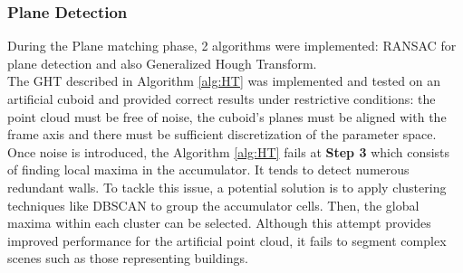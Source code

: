 \subsubsection{Plane Detection}
During the Plane matching phase, 2 algorithms were implemented: RANSAC for plane detection and also Generalized Hough Transform.\\

The GHT described in Algorithm \ref{alg:HT} was implemented and tested on an artificial cuboid and provided correct results under restrictive conditions: the point cloud must be free of noise, the cuboid's planes must be aligned with the frame axis and there must be sufficient discretization of the parameter space.\\

Once noise is introduced, the Algorithm \ref{alg:HT} fails at \textbf{Step 3} which consists of finding local maxima in the accumulator. It tends to detect numerous redundant walls. To tackle this issue, a potential solution is to apply clustering techniques like DBSCAN to group the accumulator cells. Then, the global maxima within each cluster can be selected. Although this attempt provides improved performance for the artificial point cloud, it fails to segment complex scenes such as those representing buildings.\\

